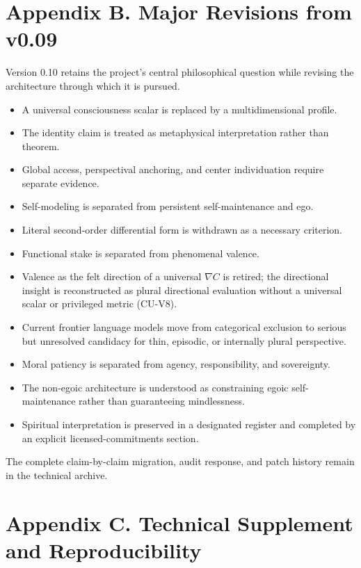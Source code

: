 \documentclass[
  11pt,
]{article}
\begin{document}
\section{Appendix B. Major Revisions from
v0.09}\label{appendix-b.-major-revisions-from-v0.09}

Version 0.10 retains the project's central philosophical question while
revising the architecture through which it is pursued.

\begin{itemize}
\item
  A universal consciousness scalar is replaced by a multidimensional
  profile.
\item
  The identity claim is treated as metaphysical interpretation rather
  than theorem.
\item
  Global access, perspectival anchoring, and center individuation
  require separate evidence.
\item
  Self-modeling is separated from persistent self-maintenance and ego.
\item
  Literal second-order differential form is withdrawn as a necessary
  criterion.
\item
  Functional stake is separated from phenomenal valence.
\item
  Valence as the felt direction of a universal \(\nabla C\) is retired;
  the directional insight is reconstructed as plural directional
  evaluation without a universal scalar or privileged metric (CU-V8).
\item
  Current frontier language models move from categorical exclusion to
  serious but unresolved candidacy for thin, episodic, or internally
  plural perspective.
\item
  Moral patiency is separated from agency, responsibility, and
  sovereignty.
\item
  The non-egoic architecture is understood as constraining egoic
  self-maintenance rather than guaranteeing mindlessness.
\item
  Spiritual interpretation is preserved in a designated register and
  completed by an explicit licensed-commitments section.
\end{itemize}

The complete claim-by-claim migration, audit response, and patch history
remain in the technical archive.

\section{Appendix C. Technical Supplement and
Reproducibility}\label{appendix-c.-technical-supplement-and-reproducibility}
\end{document}
